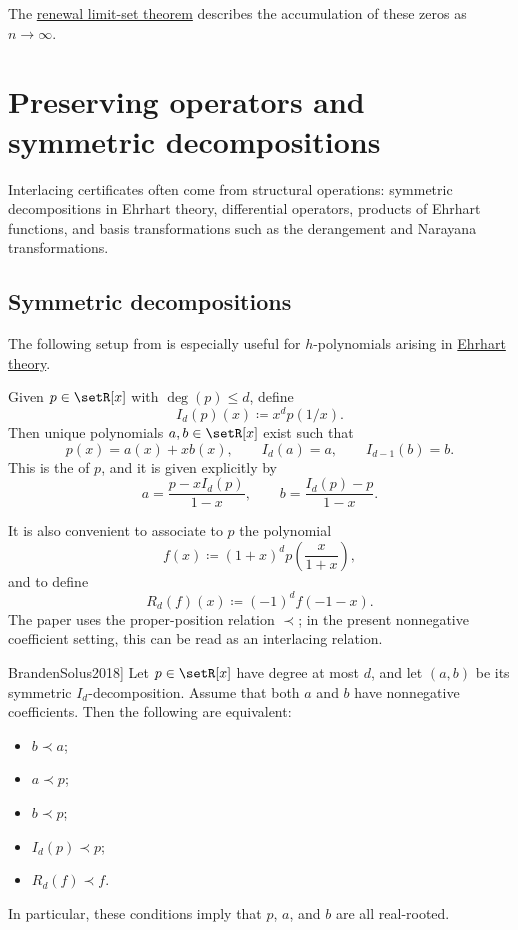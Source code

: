 The \hyperref[recurrenceRenewalLimitSet]{renewal limit-set theorem}
describes the accumulation of these zeros as $n\to\infty$.

\section[interlacingTransforms]{Preserving operators and symmetric decompositions}

Interlacing certificates often come from structural operations: symmetric
decompositions in Ehrhart theory, differential operators, products of
Ehrhart functions, and basis transformations such as the derangement and
Narayana transformations.


\subsection[symmetricDecompInterlacing]{Symmetric decompositions}

The following setup from \cite{BrandenSolus2018} is especially useful for
$h$-polynomials arising in \hyperref[ehrhart]{Ehrhart theory}.

Given $p \in \setR[x]$ with $\deg(p) \leq d$, define
\[
 I_d(p)(x) \coloneqq x^d p(1/x).
\]
Then unique polynomials $a,b \in \setR[x]$ exist such that
\[
 p(x) = a(x) + x b(x), \qquad I_d(a)=a, \qquad I_{d-1}(b)=b.
\]
This is the \label{symmetricIDecomposition}
of $p$, and it is given
explicitly by
\[
 a = \frac{p - x I_d(p)}{1-x}, \qquad b = \frac{I_d(p)-p}{1-x}.
\]

It is also convenient to associate to $p$ the polynomial
\[
 f(x) \coloneqq (1+x)^d p\!\left( \frac{x}{1+x}\right),
\]
and to define
\[
 R_d(f)(x) \coloneqq (-1)^d f(-1-x).
\]
The paper uses the proper-position relation $\prec$; in the present
nonnegative coefficient setting, this can be read as an interlacing relation.

\begin{theorem}[Brändén--Solus, \cite[Thm.~2.7]{BrandenSolus2018}]
Let $p \in \setR[x]$ have degree at most $d$, and let $(a,b)$ be its
symmetric $I_d$-decomposition.
Assume that both $a$ and $b$ have nonnegative coefficients.  Then the
following are equivalent:
\begin{itemize}
\item $b \prec a$;
\item $a \prec p$;
\item $b \prec p$;
\item $I_d(p) \prec p$;
\item $R_d(f) \prec f$.
\end{itemize}
In particular, these conditions imply that $p$, $a$, and $b$ are all
real-rooted.
\end{theorem}

